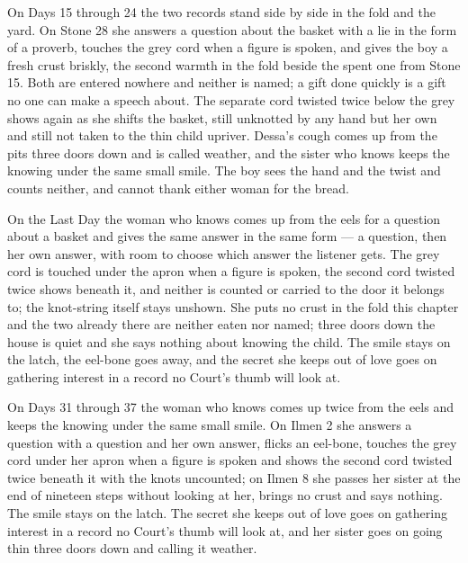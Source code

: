 \documentclass{design/chronicle}
\begin{document}
{On Days 15 through 24 the two records stand side by side in the fold and the yard. On Stone 28 she answers a question about the basket with a lie in the form of a proverb, touches the grey cord when a figure is spoken, and gives the boy a fresh crust briskly, the second warmth in the fold beside the spent one from Stone 15. Both are entered nowhere and neither is named; a gift done quickly is a gift no one can make a speech about. The separate cord twisted twice below the grey shows again as she shifts the basket, still unknotted by any hand but her own and still not taken to the thin child upriver. Dessa’s cough comes up from the pits three doors down and is called weather, and the sister who knows keeps the knowing under the same small smile. The boy sees the hand and the twist and counts neither, and cannot thank either woman for the bread.

On the Last Day the woman who knows comes up from the eels for a question about a basket and gives the same answer in the same form --- a question, then her own answer, with room to choose which answer the listener gets. The grey cord is touched under the apron when a figure is spoken, the second cord twisted twice shows beneath it, and neither is counted or carried to the door it belongs to; the knot-string itself stays unshown. She puts no crust in the fold this chapter and the two already there are neither eaten nor named; three doors down the house is quiet and she says nothing about knowing the child. The smile stays on the latch, the eel-bone goes away, and the secret she keeps out of love goes on gathering interest in a record no Court’s thumb will look at.

On Days 31 through 37 the woman who knows comes up twice from the eels and keeps the knowing under the same small smile. On Ilmen 2 she answers a question with a question and her own answer, flicks an eel-bone, touches the grey cord under her apron when a figure is spoken and shows the second cord twisted twice beneath it with the knots uncounted; on Ilmen 8 she passes her sister at the end of nineteen steps without looking at her, brings no crust and says nothing. The smile stays on the latch. The secret she keeps out of love goes on gathering interest in a record no Court’s thumb will look at, and her sister goes on going thin three doors down and calling it weather.

}
\end{document}
